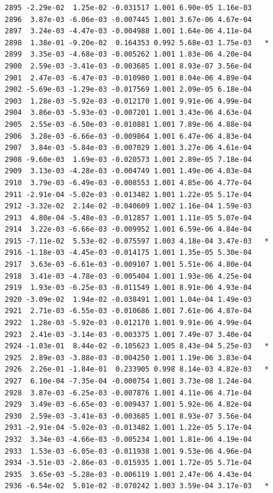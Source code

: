 \documentclass[
  letterpaper,
  DIV=11,
  numbers=noendperiod]{scrartcl}
\begin{document}
\begin{verbatim}
2895 -2.29e-02  1.25e-02 -0.031517 1.001 6.90e-05 1.16e-03    
2896  3.87e-03 -6.06e-03 -0.007445 1.001 3.67e-06 4.67e-04    
2897  3.24e-03 -4.47e-03 -0.004988 1.001 1.64e-06 4.11e-04    
2898  1.38e-01 -9.20e-02  0.164353 0.992 5.68e-03 1.75e-03   *
2899  3.35e-03 -4.68e-03 -0.005262 1.001 1.83e-06 4.20e-04    
2900  2.59e-03 -3.41e-03 -0.003685 1.001 8.93e-07 3.56e-04    
2901  2.47e-03 -6.47e-03 -0.010980 1.001 8.04e-06 4.89e-04    
2902 -5.69e-03 -1.29e-03 -0.017569 1.001 2.09e-05 6.18e-04    
2903  1.28e-03 -5.92e-03 -0.012170 1.001 9.91e-06 4.99e-04    
2904  3.86e-03 -5.93e-03 -0.007201 1.001 3.43e-06 4.63e-04    
2905  2.55e-03 -6.50e-03 -0.010881 1.001 7.89e-06 4.88e-04    
2906  3.28e-03 -6.66e-03 -0.009864 1.001 6.47e-06 4.83e-04    
2907  3.84e-03 -5.84e-03 -0.007029 1.001 3.27e-06 4.61e-04    
2908 -9.60e-03  1.69e-03 -0.020573 1.001 2.89e-05 7.18e-04    
2909  3.13e-03 -4.28e-03 -0.004749 1.001 1.49e-06 4.03e-04    
2910  3.79e-03 -6.49e-03 -0.008553 1.001 4.85e-06 4.77e-04    
2911 -2.91e-04 -5.02e-03 -0.013482 1.001 1.22e-05 5.17e-04    
2912 -3.32e-02  2.14e-02 -0.040609 1.002 1.16e-04 1.59e-03    
2913  4.80e-04 -5.48e-03 -0.012857 1.001 1.11e-05 5.07e-04    
2914  3.22e-03 -6.66e-03 -0.009952 1.001 6.59e-06 4.84e-04    
2915 -7.11e-02  5.53e-02 -0.075597 1.003 4.18e-04 3.47e-03   *
2916 -1.18e-03 -4.45e-03 -0.014175 1.001 1.35e-05 5.30e-04    
2917  3.63e-03 -6.61e-03 -0.009107 1.001 5.51e-06 4.80e-04    
2918  3.41e-03 -4.78e-03 -0.005404 1.001 1.93e-06 4.25e-04    
2919  1.93e-03 -6.25e-03 -0.011549 1.001 8.91e-06 4.93e-04    
2920 -3.09e-02  1.94e-02 -0.038491 1.001 1.04e-04 1.49e-03    
2921  2.71e-03 -6.55e-03 -0.010686 1.001 7.61e-06 4.87e-04    
2922  1.28e-03 -5.92e-03 -0.012170 1.001 9.91e-06 4.99e-04    
2923  2.41e-03 -3.14e-03 -0.003375 1.001 7.49e-07 3.40e-04    
2924 -1.03e-01  8.44e-02 -0.105623 1.005 8.43e-04 5.25e-03   *
2925  2.89e-03 -3.88e-03 -0.004250 1.001 1.19e-06 3.83e-04    
2926  2.26e-01 -1.84e-01  0.233905 0.998 8.14e-03 4.82e-03   *
2927  6.10e-04 -7.35e-04 -0.000754 1.001 3.73e-08 1.24e-04    
2928  3.87e-03 -6.25e-03 -0.007876 1.001 4.11e-06 4.71e-04    
2929  3.49e-03 -6.65e-03 -0.009437 1.001 5.92e-06 4.82e-04    
2930  2.59e-03 -3.41e-03 -0.003685 1.001 8.93e-07 3.56e-04    
2931 -2.91e-04 -5.02e-03 -0.013482 1.001 1.22e-05 5.17e-04    
2932  3.34e-03 -4.66e-03 -0.005234 1.001 1.81e-06 4.19e-04    
2933  1.53e-03 -6.05e-03 -0.011938 1.001 9.53e-06 4.96e-04    
2934 -3.51e-03 -2.86e-03 -0.015935 1.001 1.72e-05 5.71e-04    
2935  3.65e-03 -5.28e-03 -0.006119 1.001 2.47e-06 4.43e-04    
2936 -6.54e-02  5.01e-02 -0.070242 1.003 3.59e-04 3.17e-03   *

\end{verbatim}
\end{document}
